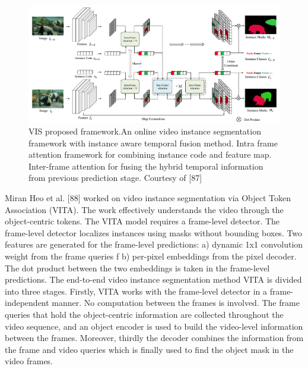     \begin{figure}
    	\centering
    	\includegraphics[width=13cm]{images/VIS.png}
    	\caption{VIS proposed framework.An online video instance segmentation framework with instance aware temporal fusion method. Intra frame attention framework for combining instance code and feature map. Inter-frame attention for fusing the hybrid temporal information from previous prediction stage. Courtesy of [87]}
    	\label{fig:vis}
    \end{figure}
    Miran Heo et al. [88] worked on video instance segmentation via Object Token Association (VITA). The work effectively understands the video through the object-centric tokens. The VITA model requires a frame-level detector. The frame-level detector localizes instances using masks without bounding boxes. Two features are generated for the frame-level predictions: a) dynamic 1x1 convolution weight from the frame queries f b) per-pixel embeddings from the pixel decoder. The dot product between the two embeddings is taken in the frame-level predictions. The end-to-end video instance segmentation method VITA is divided into three stages. Firstly, VITA works with the frame-level detector in a frame-independent manner. No computation between the frames is involved. The frame queries that hold the object-centric information are collected throughout the video sequence, and an object encoder is used to build the video-level information between the frames. Moreover, thirdly the decoder combines the information from the frame and video queries which is finally used to find the object mask in the video frames. 
    
